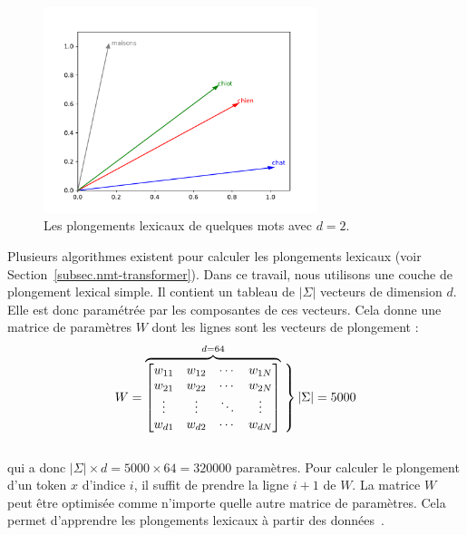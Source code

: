 \begin{figure}[htb]
    \begin{center}
        \includegraphics[width=8cm]{assets/python/word-embeddings.pdf}
    \end{center}
    \caption{Les plongements lexicaux de quelques mots avec \(d=2\).}
    \label{fig.embeddings}
\end{figure}

Plusieurs algorithmes existent pour calculer les plongements lexicaux (voir Section~\ref{subsec.nmt-transformer}).
Dans ce travail, nous utilisons une couche de plongement lexical simple.
Il contient un tableau de \(|\Sigma|\) vecteurs de dimension \(d\).
Elle est donc paramétrée par les composantes de ces vecteurs.
Cela donne une matrice de paramètres \(W\) dont les lignes sont les vecteurs de plongement :
\begin{equation}
    W = \overbrace{
    \begin{bmatrix}
        w_{11} & w_{12} & \cdots & w_{1N}\\
        w_{21} & w_{22} & \cdots & w_{2N}\\
        \vdots & \vdots & \ddots & \vdots\\
        w_{d1} & w_{d2} & \cdots & w_{dN}\\
    \end{bmatrix}}^{d = 64}
    \left.\vphantom{
        \begin{bmatrix}
            w_{11} & w_{12} & \cdots & w_{1N}\\
            w_{21} & w_{22} & \cdots & w_{2N}\\
            \vdots & \vdots & \ddots & \vdots\\
            w_{d1} & w_{d2} & \cdots & w_{dN}\\
        \end{bmatrix}}\right\}|\Sigma| = 5000
\end{equation}\\
qui a donc \(|\Sigma| \times d = 5000 \times 64 = 320000\) paramètres.
Pour calculer le plongement d'un token \(x\) d'indice \(i\), il suffit de prendre la ligne \(i+1\) de \(W\).
La matrice \(W\) peut être optimisée comme n'importe quelle autre matrice de paramètres.
Cela permet d'apprendre les plongements lexicaux à partir des données~\cite{Paszke_et_al_2019}.


